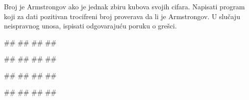 \begin{Exercise}[label=KT_NG_13] 
Broj je Armstrongov ako je jednak zbiru kubova svojih cifara. 
Napisati program koji za dati pozitivan trocifreni broj proverava 
da li je Armstrongov.
U slučaju neispravnog unosa, ispisati odgovarajuću poruku o grešci.

\begin{miditest}
\begin{upotreba}{1}
#\naslovInt#
##
##
##
\end{upotreba}
\end{miditest}
\begin{miditest}
\begin{upotreba}{2}
#\naslovInt#
##
##
##
\end{upotreba}
\end{miditest}

\begin{miditest}
\begin{upotreba}{3}
#\naslovInt#
##
##
##
\end{upotreba}
\end{miditest}
\begin{miditest}
\begin{upotreba}{4}
#\naslovInt#
##
##
##
\end{upotreba}
\end{miditest}

\end{Exercise}
\ifresenja
 \begin{Answer}[ref=KT_NG_13]
\end{Answer}
\fi


